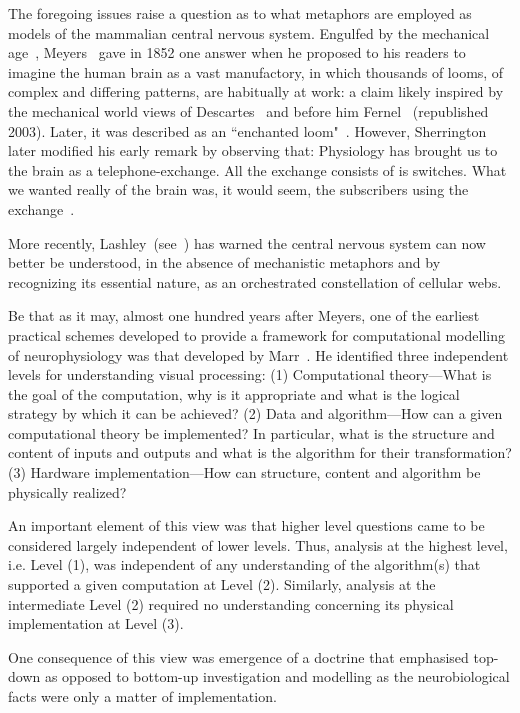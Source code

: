 \documentclass[10pt,letterpaper]{article}
\begin{document}
The foregoing issues raise a question as to what metaphors are employed as models of the mammalian central nervous system. Engulfed by the mechanical age~\cite{carlyle52}, Meyers~\cite{meyers87} gave in 1852 one answer when he proposed to his readers to imagine the human brain as a vast manufactory, in which thousands of looms, of complex and differing patterns, are habitually at work: a claim likely inspired by the mechanical world views of Descartes~\cite{descartes62} and before him Fernel~\cite{fernel67} (republished 2003). Later, it was described as an ``enchanted loom"~\cite{sherrington53}. However, Sherrington later modified his early remark by observing that: Physiology has brought us to the brain as a telephone-exchange. All the exchange consists of is switches. What we wanted really of the brain was, it would seem, the subscribers using the exchange~\cite{sherrington53}.

More recently, Lashley~(see~\cite{jorgensen21}) has warned the central nervous system can now better be understood, in the absence of mechanistic metaphors and by recognizing its essential nature, as an orchestrated constellation of cellular webs.

Be that as it may, almost one hundred years after Meyers, one of the earliest practical schemes developed to provide a framework for computational modelling of neurophysiology was that developed by Marr~\cite{Marr:1982fk}. He identified three independent levels for understanding visual processing: (1) Computational theory---What is the goal of the computation, why is it appropriate and what is the logical strategy by which it can be achieved? (2) Data and algorithm---How can a given computational theory be implemented? In particular, what is the structure and content of inputs and outputs and what is the algorithm for their transformation? (3) Hardware implementation---How can structure, content and algorithm be physically realized?

An important element of this view was that higher level questions came to be considered largely independent of lower levels. Thus, analysis at the highest level, i.e. Level (1), was independent of any understanding of the algorithm(s) that supported a given computation at Level (2). Similarly, analysis at the intermediate Level (2) required no understanding concerning its physical implementation at Level (3).

One consequence of this view was emergence of a doctrine that emphasised top-down as opposed to bottom-up investigation and modelling as the neurobiological facts were only a matter of implementation.
\end{document}
